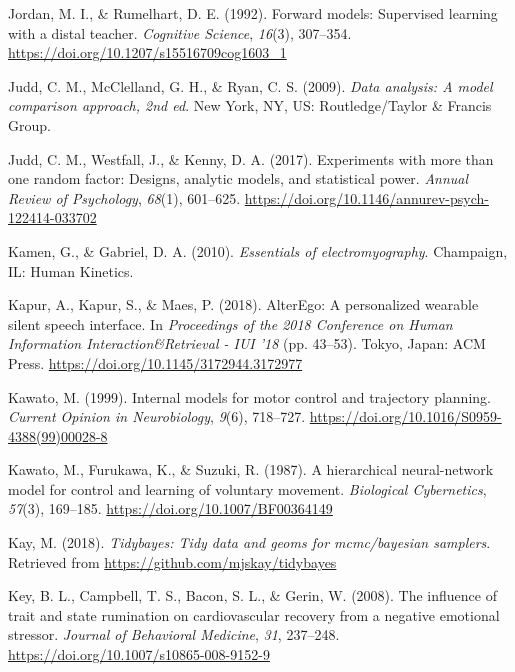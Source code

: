\documentclass[a4paper,12pt,twoside,onecolumn,openright,final,oldfontcommands]{memoir}
\begin{document}
\leavevmode\hypertarget{ref-jordan_forward_1992}{}%
Jordan, M. I., \& Rumelhart, D. E. (1992). Forward models: Supervised learning with a distal teacher. \emph{Cognitive Science}, \emph{16}(3), 307--354. \url{https://doi.org/10.1207/s15516709cog1603_1}

\leavevmode\hypertarget{ref-judd_data_2009}{}%
Judd, C. M., McClelland, G. H., \& Ryan, C. S. (2009). \emph{Data analysis: A model comparison approach, 2nd ed}. New York, NY, US: Routledge/Taylor \& Francis Group.

\leavevmode\hypertarget{ref-judd_experiments_2017}{}%
Judd, C. M., Westfall, J., \& Kenny, D. A. (2017). Experiments with more than one random factor: Designs, analytic models, and statistical power. \emph{Annual Review of Psychology}, \emph{68}(1), 601--625. \url{https://doi.org/10.1146/annurev-psych-122414-033702}

\leavevmode\hypertarget{ref-kamen_essentials_2010}{}%
Kamen, G., \& Gabriel, D. A. (2010). \emph{Essentials of electromyography}. Champaign, IL: Human Kinetics.

\leavevmode\hypertarget{ref-kapur_alterego_2018}{}%
Kapur, A., Kapur, S., \& Maes, P. (2018). AlterEgo: A personalized wearable silent speech interface. In \emph{Proceedings of the 2018 Conference on Human Information Interaction\&Retrieval - IUI '18} (pp. 43--53). Tokyo, Japan: ACM Press. \url{https://doi.org/10.1145/3172944.3172977}

\leavevmode\hypertarget{ref-kawato_internal_1999}{}%
Kawato, M. (1999). Internal models for motor control and trajectory planning. \emph{Current Opinion in Neurobiology}, \emph{9}(6), 718--727. \url{https://doi.org/10.1016/S0959-4388(99)00028-8}

\leavevmode\hypertarget{ref-kawato_hierarchical_1987}{}%
Kawato, M., Furukawa, K., \& Suzuki, R. (1987). A hierarchical neural-network model for control and learning of voluntary movement. \emph{Biological Cybernetics}, \emph{57}(3), 169--185. \url{https://doi.org/10.1007/BF00364149}

\leavevmode\hypertarget{ref-R-tidybayes}{}%
Kay, M. (2018). \emph{Tidybayes: Tidy data and geoms for mcmc/bayesian samplers}. Retrieved from \url{https://github.com/mjskay/tidybayes}

\leavevmode\hypertarget{ref-Key2008}{}%
Key, B. L., Campbell, T. S., Bacon, S. L., \& Gerin, W. (2008). The influence of trait and state rumination on cardiovascular recovery from a negative emotional stressor. \emph{Journal of Behavioral Medicine}, \emph{31}, 237--248. \url{https://doi.org/10.1007/s10865-008-9152-9}
\end{document}
